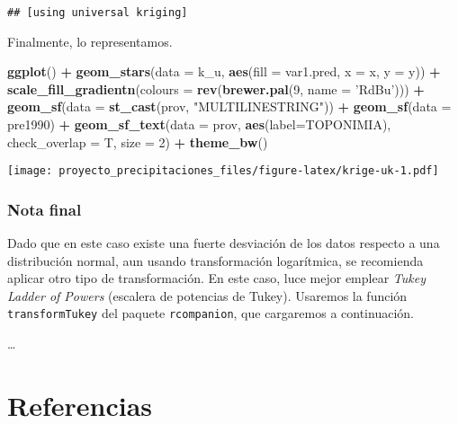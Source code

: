 \documentclass[11pt,]{article}
\newenvironment{Shaded}{\begin{snugshade}}{\end{snugshade}}
\newcommand{\KeywordTok}[1]{\textcolor[rgb]{0.13,0.29,0.53}{\textbf{#1}}}
\newcommand{\DataTypeTok}[1]{\textcolor[rgb]{0.13,0.29,0.53}{#1}}
\newcommand{\DecValTok}[1]{\textcolor[rgb]{0.00,0.00,0.81}{#1}}
\newcommand{\StringTok}[1]{\textcolor[rgb]{0.31,0.60,0.02}{#1}}
\newcommand{\OperatorTok}[1]{\textcolor[rgb]{0.81,0.36,0.00}{\textbf{#1}}}
\newcommand{\NormalTok}[1]{#1}
\begin{document}
\begin{verbatim}
## [using universal kriging]
\end{verbatim}

Finalmente, lo representamos.

\begin{Shaded}
\begin{Highlighting}[]
\KeywordTok{ggplot}\NormalTok{() }\OperatorTok{+}
\StringTok{  }\KeywordTok{geom_stars}\NormalTok{(}\DataTypeTok{data =}\NormalTok{ k_u, }\KeywordTok{aes}\NormalTok{(}\DataTypeTok{fill =}\NormalTok{ var1.pred, }\DataTypeTok{x =}\NormalTok{ x, }\DataTypeTok{y =}\NormalTok{ y)) }\OperatorTok{+}\StringTok{ }
\StringTok{  }\KeywordTok{scale_fill_gradientn}\NormalTok{(}\DataTypeTok{colours =} \KeywordTok{rev}\NormalTok{(}\KeywordTok{brewer.pal}\NormalTok{(}\DecValTok{9}\NormalTok{, }\DataTypeTok{name =} \StringTok{'RdBu'}\NormalTok{))) }\OperatorTok{+}
\StringTok{  }\KeywordTok{geom_sf}\NormalTok{(}\DataTypeTok{data =} \KeywordTok{st_cast}\NormalTok{(prov, }\StringTok{"MULTILINESTRING"}\NormalTok{)) }\OperatorTok{+}
\StringTok{  }\KeywordTok{geom_sf}\NormalTok{(}\DataTypeTok{data =}\NormalTok{ pre1990) }\OperatorTok{+}
\StringTok{  }\KeywordTok{geom_sf_text}\NormalTok{(}\DataTypeTok{data =}\NormalTok{ prov, }\KeywordTok{aes}\NormalTok{(}\DataTypeTok{label=}\NormalTok{TOPONIMIA), }\DataTypeTok{check_overlap =}\NormalTok{ T, }\DataTypeTok{size =} \DecValTok{2}\NormalTok{) }\OperatorTok{+}
\StringTok{  }\KeywordTok{theme_bw}\NormalTok{()}
\end{Highlighting}
\end{Shaded}

\texttt{[image: proyecto\_precipitaciones\_files/figure-latex/krige-uk-1.pdf]}

\subsubsection{Nota final}\label{nota-final}

Dado que en este caso existe una fuerte desviación de los datos respecto
a una distribución normal, aun usando transformación logarítmica, se
recomienda aplicar otro tipo de transformación. En este caso, luce mejor
emplear \emph{Tukey Ladder of Powers} (escalera de potencias de Tukey).
Usaremos la función \texttt{transformTukey} del paquete
\texttt{rcompanion}, que cargaremos a continuación.

\begin{Shaded}
\end{Shaded}

\ldots

\section{Referencias}\label{referencias}




\newpage
\singlespacing 
\end{document}
